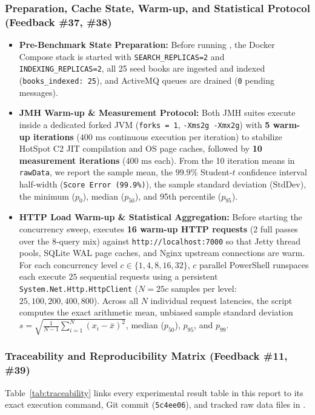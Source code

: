 \documentclass[10pt,a4paper]{article}
\begin{document}
\subsubsection{Preparation, Cache State, Warm-up, and Statistical Protocol (Feedback \#37, \#38)}
\begin{itemize}[leftmargin=*,nosep]
    \item \textbf{Pre-Benchmark State Preparation:} Before running , the Docker Compose stack is started with \texttt{SEARCH\_REPLICAS=2} and \texttt{INDEXING\_REPLICAS=2}, all 25 seed books are ingested and indexed (\texttt{books\_indexed: 25}), and ActiveMQ queues are drained (\texttt{0} pending messages).
    \item \textbf{JMH Warm-up \& Measurement Protocol:} Both JMH suites execute inside a dedicated forked JVM (\texttt{forks = 1}, \texttt{-Xms2g -Xmx2g}) with \textbf{5 warm-up iterations} ($400\text{ ms}$ continuous execution per iteration) to stabilize HotSpot C2 JIT compilation and OS page caches, followed by \textbf{10 measurement iterations} ($400\text{ ms}$ each). From the 10 iteration means in \texttt{rawData}, we report the sample mean, the $99.9\%$ Student-$t$ confidence interval half-width (\texttt{Score Error (99.9\%)}), the sample standard deviation ($\text{StdDev}$), the minimum ($p_0$), median ($p_{50}$), and 95th percentile ($p_{95}$).
    \item \textbf{HTTP Load Warm-up \& Statistical Aggregation:} Before starting the concurrency sweep,  executes \textbf{16 warm-up HTTP requests} (2 full passes over the 8-query mix) against \texttt{http://localhost:7000} so that Jetty thread pools, SQLite WAL page caches, and Nginx upstream connections are warm. For each concurrency level $c \in \{1, 4, 8, 16, 32\}$, $c$ parallel PowerShell runspaces each execute $25$ sequential requests using a persistent \texttt{System.Net.Http.HttpClient} ($N = 25c$ samples per level: $25, 100, 200, 400, 800$). Across all $N$ individual request latencies, the script computes the exact arithmetic mean, unbiased sample standard deviation $s = \sqrt{\frac{1}{N-1}\sum_{i=1}^N (x_i - \bar{x})^2}$, median ($p_{50}$), $p_{95}$, and $p_{99}$.
\end{itemize}

\subsubsection{Traceability and Reproducibility Matrix (Feedback \#11, \#39)}
Table~\ref{tab:traceability} links every experimental result table in this report to its exact execution command, Git commit (\texttt{5c4ee06}), and tracked raw data files in .
\end{document}
